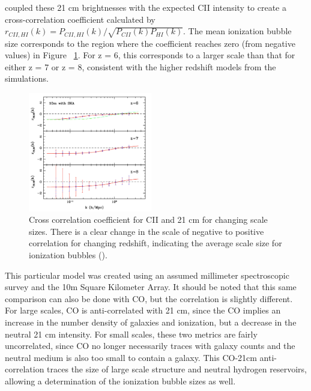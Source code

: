 \documentclass[manuscript]{aastex}
\begin{document}
\cite{Gong2012} coupled these 21 cm brightnesses with the expected CII intensity to create a cross-correlation coefficient calculated by \(r_{CII,HI}(k) = P_{CII,HI}(k)/\sqrt{P_{CII}(k)P_{HI}(k)}\). The mean ionization bubble size corresponds to the region where the coefficient reaches zero (from negative values) in Figure ~\ref{fig:gong1}. For z = 6, this corresponds to a larger scale than that for either z = 7 or z = 8, consistent with the higher redshift models from the \cite{Santos2010} simulations. 
\begin{figure}
\vspace{-0.8cm}
  \begin{center}
    \includegraphics[width=0.48\textwidth]{gong4.png}
  \end{center}
  \caption[Cross correlation coefficient for CII and 21 cm showing ionization bubble size with redshift. -(\cite{Gong2012})]{Cross correlation coefficient for CII and 21 cm for changing scale sizes. There is a clear change in the scale of negative to positive correlation for changing redshift, indicating the average scale size for ionization bubbles (\cite{Gong2012}).}
  \label{fig:gong1}
  \vspace{-0.8cm}
\end{figure}
This particular model was created using an assumed millimeter spectroscopic survey and the 10m Square Kilometer Array. It should be noted that this same comparison can also be done with CO, but the correlation is slightly different. For large scales, CO is anti-correlated with 21 cm, since the CO implies an increase in the number density of galaxies and ionization, but a decrease in the neutral 21 cm intensity. For small scales, these two metrics are fairly uncorrelated, since CO no longer necessarily traces with galaxy counts and the neutral medium is also too small to contain a galaxy. This CO-21cm anti-correlation traces the size of large scale structure and neutral hydrogen reservoirs, allowing a determination of the ionization bubble sizes as well. 
\end{document}

